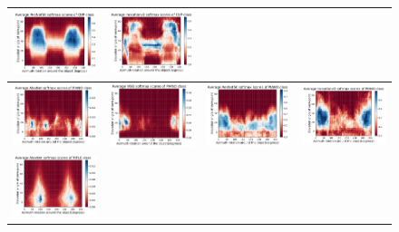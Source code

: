 \begin{figure}[h]
\begin{tabular}{||c|c|c|c||}
\includegraphics[width = 4cm]{supimages/nms2d/ResNet50_cup_Average.pdf}&
\includegraphics[width = 4cm]{supimages/nms2d/Inceptionv3_cup_Average.pdf}\\ \hline
\includegraphics[width = 4cm]{supimages/nms2d/AlexNet_piano_Average.pdf}&
\includegraphics[width = 4cm]{supimages/nms2d/VGG_piano_Average.pdf}&
\includegraphics[width = 4cm]{supimages/nms2d/ResNet50_piano_Average.pdf}&
\includegraphics[width = 4cm]{supimages/nms2d/Inceptionv3_piano_Average.pdf}\\ \hline
\includegraphics[width = 4cm]{supimages/nms2d/AlexNet_rifle_Average.pdf}&

\end{tabular}
\end{figure}
